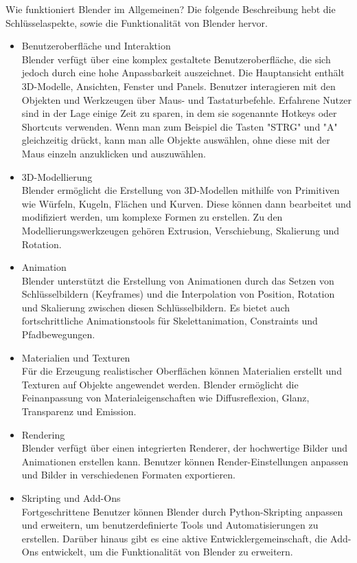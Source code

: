 \begin{itemize}
\begin{itemize}
\end{itemize}
Wie funktioniert Blender im Allgemeinen? Die folgende Beschreibung hebt die Schlüsselaspekte, sowie die Funktionalität von Blender hervor.
\begin{itemize}
	\item Benutzeroberfläche und Interaktion\\
	Blender verfügt über eine komplex gestaltete Benutzeroberfläche, die sich jedoch durch eine hohe Anpassbarkeit auszeichnet. Die Hauptansicht enthält 3D-Modelle, Ansichten, Fenster und Panels. Benutzer interagieren mit den Objekten und Werkzeugen über Maus- und Tastaturbefehle. Erfahrene Nutzer sind in der Lage einige Zeit zu sparen, in dem sie sogenannte Hotkeys oder Shortcuts verwenden. Wenn man zum Beispiel die Tasten "STRG" und "A" gleichzeitig drückt, kann man alle Objekte auswählen, ohne diese mit der Maus einzeln anzuklicken und auszuwählen.
	\item 3D-Modellierung\\
	Blender ermöglicht die Erstellung von 3D-Modellen mithilfe von Primitiven wie Würfeln, Kugeln, Flächen und Kurven. Diese können dann bearbeitet und modifiziert werden, um komplexe Formen zu erstellen. Zu den Modellierungswerkzeugen gehören Extrusion, Verschiebung, Skalierung und Rotation.
	\item Animation\\
	Blender unterstützt die Erstellung von Animationen durch das Setzen von Schlüsselbildern (Keyframes) und die Interpolation von Position, Rotation und Skalierung zwischen diesen Schlüsselbildern. Es bietet auch fortschrittliche Animationstools für Skelettanimation, Constraints und Pfadbewegungen.
	\item Materialien und Texturen\\
	Für die Erzeugung realistischer Oberflächen können Materialien erstellt und Texturen auf Objekte angewendet werden. Blender ermöglicht die Feinanpassung von Materialeigenschaften wie Diffusreflexion, Glanz, Transparenz und Emission.
	\item Rendering\\
	Blender verfügt über einen integrierten Renderer, der hochwertige Bilder und Animationen erstellen kann. Benutzer können Render-Einstellungen anpassen und Bilder in verschiedenen Formaten exportieren.
	\item Skripting und Add-Ons\\
	Fortgeschrittene Benutzer können Blender durch Python-Skripting anpassen und erweitern, um benutzerdefinierte Tools und Automatisierungen zu erstellen. Darüber hinaus gibt es eine aktive Entwicklergemeinschaft, die Add-Ons entwickelt, um die Funktionalität von Blender zu erweitern.

\end{itemize}
\end{itemize}
